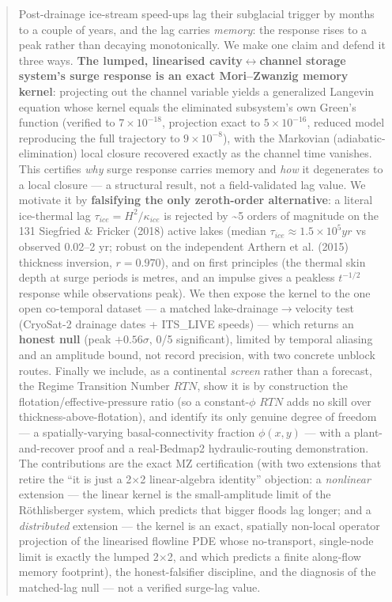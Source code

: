 \documentclass[tc, manuscript]{copernicus}
\begin{document}
\begin{abstract}
Post-drainage ice-stream speed-ups lag their subglacial trigger by months to a couple of years, and the lag carries \emph{memory}: the response rises to a peak rather than decaying monotonically. We make one claim and defend it three ways. \textbf{The lumped, linearised cavity\ensuremath{\leftrightarrow}channel storage system's surge response is an exact Mori–Zwanzig memory kernel}: projecting out the channel variable yields a generalized Langevin equation whose kernel equals the eliminated subsystem's own Green's function (verified to $7\times 10^{-18}$, projection exact to $5\times 10^{-16}$, reduced model reproducing the full trajectory to $9\times 10^{-8}$), with the Markovian (adiabatic-elimination) local closure recovered exactly as the channel time vanishes. This certifies \emph{why} surge response carries memory and \emph{how} it degenerates to a local closure — a structural result, not a field-validated lag value. We motivate it by \textbf{falsifying the only zeroth-order alternative}: a literal ice-thermal lag $\tau _{ice}=H^{2}/\kappa _{ice}$ is rejected by \textasciitilde{}5 orders of magnitude on the 131 Siegfried \& Fricker (2018) active lakes (median $\tau _{ice}\approx 1.5\times 10^{5} yr$ vs observed 0.02–2 yr; robust on the independent Arthern et al. (2015) thickness inversion, $r=0.970$), and on first principles (the thermal skin depth at surge periods is metres, and an impulse gives a peakless $t^{-1/2}$ response while observations peak). We then expose the kernel to the one open co-temporal dataset — a matched lake-drainage\ensuremath{\to}velocity test (CryoSat-2 drainage dates + ITS\_LIVE speeds) — which returns an \textbf{honest null} (peak $+0.56\sigma $, 0/5 significant), limited by temporal aliasing and an amplitude bound, not record precision, with two concrete unblock routes. Finally we include, as a continental \emph{screen} rather than a forecast, the Regime Transition Number $RTN$, show it is by construction the flotation/effective-pressure ratio (so a constant-$\phi $ $RTN$ adds no skill over thickness-above-flotation), and identify its only genuine degree of freedom — a spatially-varying basal-connectivity fraction $\phi (x,y)$ — with a plant-and-recover proof and a real-Bedmap2 hydraulic-routing demonstration. The contributions are the exact MZ certification (with two extensions that retire the ``it is just a 2\ensuremath{\times}2 linear-algebra identity'' objection: a \emph{nonlinear} extension — the linear kernel is the small-amplitude limit of the Röthlisberger system, which predicts that bigger floods lag longer; and a \emph{distributed} extension — the kernel is an exact, spatially non-local operator projection of the linearised flowline PDE whose no-transport, single-node limit is exactly the lumped 2\ensuremath{\times}2, and which predicts a finite along-flow memory footprint), the honest-falsifier discipline, and the diagnosis of the matched-lag null — not a verified surge-lag value.
\end{abstract}
\end{document}
